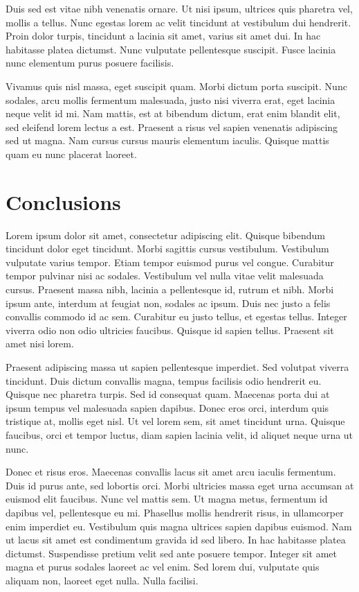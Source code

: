 \documentclass[12pt]{report}
\begin{document}
Duis sed est vitae nibh venenatis ornare. Ut nisi ipsum, ultrices quis pharetra vel, mollis a tellus. Nunc egestas lorem ac velit tincidunt at vestibulum dui hendrerit. Proin dolor turpis, tincidunt a lacinia sit amet, varius sit amet dui. In hac habitasse platea dictumst. Nunc vulputate pellentesque suscipit. Fusce lacinia nunc elementum purus posuere facilisis.

Vivamus quis nisl massa, eget suscipit quam. Morbi dictum porta suscipit. Nunc sodales, arcu mollis fermentum malesuada, justo nisi viverra erat, eget lacinia neque velit id mi. Nam mattis, est at bibendum dictum, erat enim blandit elit, sed eleifend lorem lectus a est. Praesent a risus vel sapien venenatis adipiscing sed ut magna. Nam cursus cursus mauris elementum iaculis. Quisque mattis quam eu nunc placerat laoreet.


\chapter{Conclusions}\label{chap:conclusions}
Lorem ipsum dolor sit amet, consectetur adipiscing elit. Quisque bibendum tincidunt dolor eget tincidunt. Morbi sagittis cursus vestibulum. Vestibulum vulputate varius tempor. Etiam tempor euismod purus vel congue. Curabitur tempor pulvinar nisi ac sodales. Vestibulum vel nulla vitae velit malesuada cursus. Praesent massa nibh, lacinia a pellentesque id, rutrum et nibh. Morbi ipsum ante, interdum at feugiat non, sodales ac ipsum. Duis nec justo a felis convallis commodo id ac sem. Curabitur eu justo tellus, et egestas tellus. Integer viverra odio non odio ultricies faucibus. Quisque id sapien tellus. Praesent sit amet nisi lorem.

Praesent adipiscing massa ut sapien pellentesque imperdiet. Sed volutpat viverra tincidunt. Duis dictum convallis magna, tempus facilisis odio hendrerit eu. Quisque nec pharetra turpis. Sed id consequat quam. Maecenas porta dui at ipsum tempus vel malesuada sapien dapibus. Donec eros orci, interdum quis tristique at, mollis eget nisl. Ut vel lorem sem, sit amet tincidunt urna. Quisque faucibus, orci et tempor luctus, diam sapien lacinia velit, id aliquet neque urna ut nunc.

Donec et risus eros. Maecenas convallis lacus sit amet arcu iaculis fermentum. Duis id purus ante, sed lobortis orci. Morbi ultricies massa eget urna accumsan at euismod elit faucibus. Nunc vel mattis sem. Ut magna metus, fermentum id dapibus vel, pellentesque eu mi. Phasellus mollis hendrerit risus, in ullamcorper enim imperdiet eu. Vestibulum quis magna ultrices sapien dapibus euismod. Nam ut lacus sit amet est condimentum gravida id sed libero. In hac habitasse platea dictumst. Suspendisse pretium velit sed ante posuere tempor. Integer sit amet magna et purus sodales laoreet ac vel enim. Sed lorem dui, vulputate quis aliquam non, laoreet eget nulla. Nulla facilisi.
\end{document}
